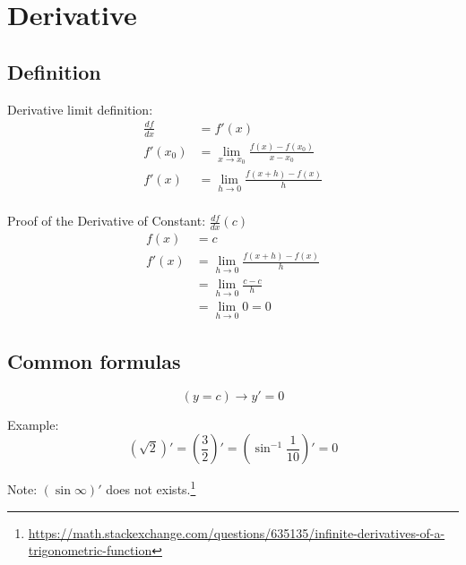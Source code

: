 \chapter{Derivative}
\section{Definition}
Derivative limit definition:
\begin{align*}
\frac{df}{dx} &= f'(x) \\
f'(x_0) &= \lim_{x\to x_0} \frac{f(x) - f(x_0)}{x-x_0} \\
f'(x) &= \lim_{h\to 0} \frac{f(x+h) - f(x)}{h} \\
\end{align*}

Proof of the Derivative of Constant: $\frac{df}{dx}(c)$
\begin{align*}
f(x)&=c \\
f'(x) &= \lim_{h\to 0}\frac{f(x+h) - f(x)}{h} \\
&= \lim_{h\to 0}\frac{c - c}{h} \\
&= \lim_{h\to 0} 0 = 0
\end{align*}

\section{Common formulas}
\label{1}
\[ (y = c)\to y'= 0 \]

Example:
\[ (\sqrt{2})' = (\frac{3}{2})' = (\sin^{-1}\frac{1}{10})' = 0 \]

Note: $(\sin\infty)'$ does not exists.\footnote{\href{https://math.stackexchange.com/questions/635135/infinite-derivatives-of-a-trigonometric-function}{https://math.stackexchange.com/questions/635135/infinite-derivatives-of-a-trigonometric-function}}

